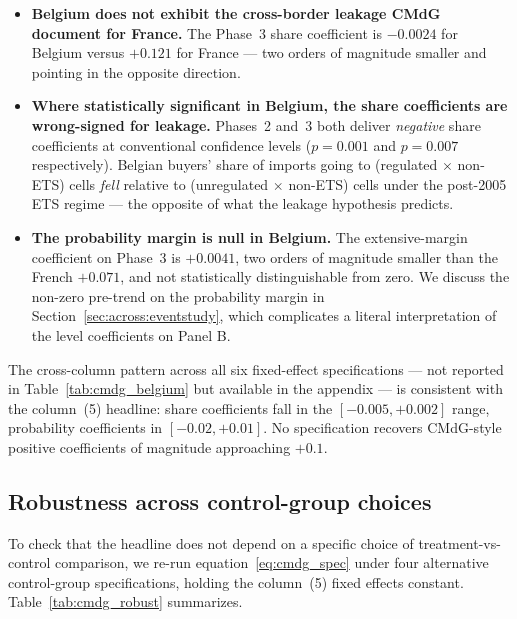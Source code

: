 \begin{itemize}
    \item \textbf{Belgium does not exhibit the cross-border leakage CMdG document for France.} The Phase~3 share coefficient is $-0.0024$ for Belgium versus $+0.121$ for France --- two orders of magnitude smaller and pointing in the opposite direction.

    \item \textbf{Where statistically significant in Belgium, the share coefficients are wrong-signed for leakage.} Phases~2 and~3 both deliver \emph{negative} share coefficients at conventional confidence levels ($p = 0.001$ and $p = 0.007$ respectively). Belgian buyers' share of imports going to (regulated $\times$ non-ETS) cells \emph{fell} relative to (unregulated $\times$ non-ETS) cells under the post-2005 ETS regime --- the opposite of what the leakage hypothesis predicts.

    \item \textbf{The probability margin is null in Belgium.} The extensive-margin coefficient on Phase~3 is $+0.0041$, two orders of magnitude smaller than the French $+0.071$, and not statistically distinguishable from zero. We discuss the non-zero pre-trend on the probability margin in Section~\ref{sec:across:eventstudy}, which complicates a literal interpretation of the level coefficients on Panel B.
\end{itemize}

The cross-column pattern across all six fixed-effect specifications --- not reported in Table~\ref{tab:cmdg_belgium} but available in the appendix --- is consistent with the column~(5) headline: share coefficients fall in the $[-0.005, +0.002]$ range, probability coefficients in $[-0.02, +0.01]$. No specification recovers CMdG-style positive coefficients of magnitude approaching $+0.1$.

\subsection{Robustness across control-group choices}\label{sec:across:robustness}

To check that the headline does not depend on a specific choice of treatment-vs-control comparison, we re-run equation~\eqref{eq:cmdg_spec} under four alternative control-group specifications, holding the column~(5) fixed effects constant. Table~\ref{tab:cmdg_robust} summarizes.

